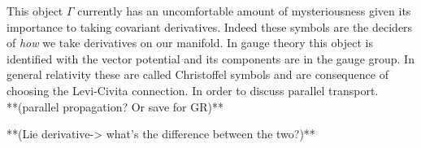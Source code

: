  This object $\Gamma$ currently has an uncomfortable amount of mysteriousness given its importance to taking covariant derivatives.  Indeed these symbols are the deciders of \textit{how} we take derivatives on our manifold.  In gauge theory this object is identified with the vector potential and its components are in the gauge group.  In general relativity these are called Christoffel symbols and are consequence of choosing the Levi-Civita connection.  In order to discuss parallel transport.\\
 **(parallel propagation? Or save for GR)**
 
 **(Lie derivative-> what's the difference between the two?)**
 
   
 
  



